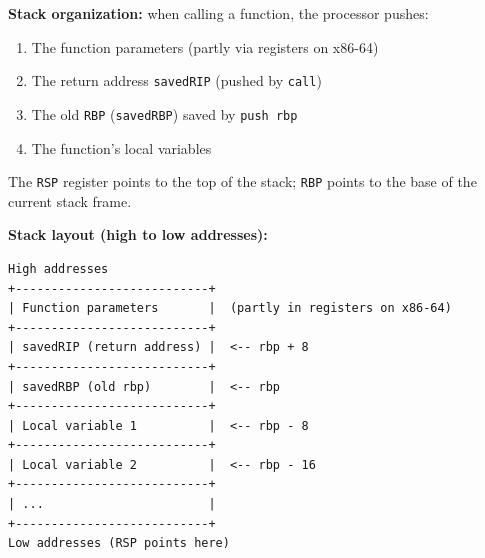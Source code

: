 \documentclass[a4paper,11pt]{article}
\theoremstyle{plain}
\theoremstyle{definition}
\begin{document}
\medskip

\begin{rappel}
\textbf{Stack organization:} when calling a function, the processor pushes:
\begin{enumerate}
    \item The function parameters (partly via registers on x86-64)
    \item The return address \texttt{savedRIP} (pushed by \texttt{call})
    \item The old \texttt{RBP} (\texttt{savedRBP}) saved by \texttt{push rbp}
    \item The function's local variables
\end{enumerate}
The \texttt{RSP} register points to the top of the stack; \texttt{RBP} points to the base of the current stack frame.

\medskip
\textbf{Stack layout (high to low addresses):}
\begin{lstlisting}[numbers=none,frame=none,backgroundcolor=\color{white}]
High addresses
+---------------------------+
| Function parameters       |  (partly in registers on x86-64)
+---------------------------+
| savedRIP (return address) |  <-- rbp + 8
+---------------------------+
| savedRBP (old rbp)        |  <-- rbp
+---------------------------+
| Local variable 1          |  <-- rbp - 8
+---------------------------+
| Local variable 2          |  <-- rbp - 16
+---------------------------+
| ...                       |
+---------------------------+
Low addresses (RSP points here)
\end{lstlisting}
\end{rappel}

\bigskip


\end{document}
